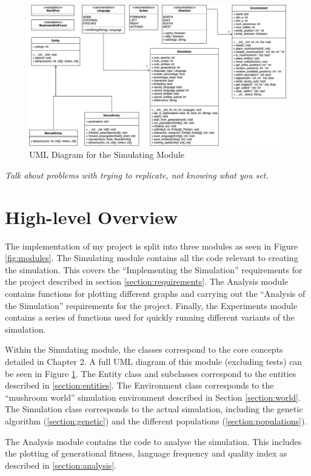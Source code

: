 \documentclass[12pt,a4paper,twoside,openright]{report}
\begin{document}
\begin{figure}[t]
  \centering
  \includegraphics[width=.9\linewidth]{figs/uml}
  \caption{UML Diagram for the Simulating Module}
  \label{fig:uml}
\end{figure}

\emph{Talk about problems with trying to replicate, not knowing what you set.}

\section{High-level Overview}

The implementation of my project is split into three modules as seen in Figure \ref{fig:modules}. The Simulating module contains all the code relevant to creating the simulation. This covers the ``Implementing the Simulation'' requirements for the project described in section \ref{section:requirements}. The Analysis module contains functions for plotting different graphs and carrying out the ``Analysis of the Simulation'' requirements for the project. Finally, the Experiments module contains a series of functions used for quickly running different variants of the simulation. 

Within the Simulating module, the classes correspond to the core concepts detailed in Chapter 2. A full UML diagram of this module (excluding tests) can be seen in Figure \ref{fig:uml}. The Entity class and subclasses correspond to the entities described in \ref{section:entities}. The Environment class corresponds to the ``mushroom world'' simulation environment described in Section \ref{section:world}. The Simulation class corresponds to the actual simulation, including the genetic algorithm (\ref{section:genetic}) and the different populations (\ref{section:populations}).

The Analysis module contains the code to analyse the simulation. This includes the plotting of generational fitness, language frequency and quality index as described in \ref{section:analysis}.
\end{document}
